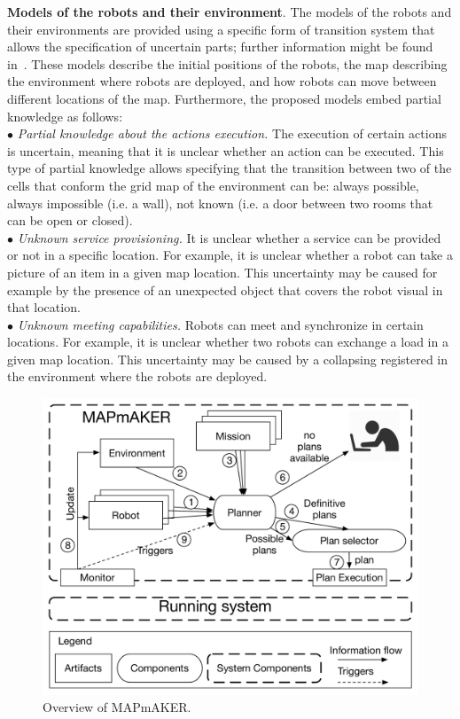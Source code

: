 \textbf{Models of the robots and their environment}. 
The models of the robots and their environments are provided using a specific form of transition system that allows the specification of uncertain parts; further information might be found in~\cite{mapmaker17}.
These models describe the initial positions of the robots, the map describing the environment where robots are deployed, and how robots can move between different locations of the map. 
Furthermore, the proposed models embed partial knowledge as follows:\\
$\bullet$  \emph{Partial knowledge about the actions execution.} 
The execution of certain actions is uncertain, meaning that it is unclear whether an action can be executed.
This type of partial knowledge allows specifying that the transition between two of the cells that conform the grid map of the environment can be:
always possible, always impossible (i.e. a wall), not known (i.e. a door between two rooms that can be open or closed).\\
$\bullet$ \emph{Unknown service provisioning.} 
It is unclear  whether a service can be provided or not in a specific location. 
For example, it is unclear whether a robot can take a picture of an item in a given map location.
This  uncertainty may be caused for example by the presence of an unexpected object that covers the robot visual in that location.\\
$\bullet$ \emph{Unknown meeting capabilities.} Robots can meet and synchronize in certain locations.
For example, it is unclear whether two robots can exchange a load in a given map location.
This uncertainty may be caused by a collapsing registered in the environment where the robots are deployed.


\begin{figure}[t]
\begin{center}
\includegraphics[width=1\linewidth]{Figures/MAPmAKER.pdf}
\caption{Overview of  MAPmAKER.}
\label{fig:overview}
\end{center}
\end{figure}




